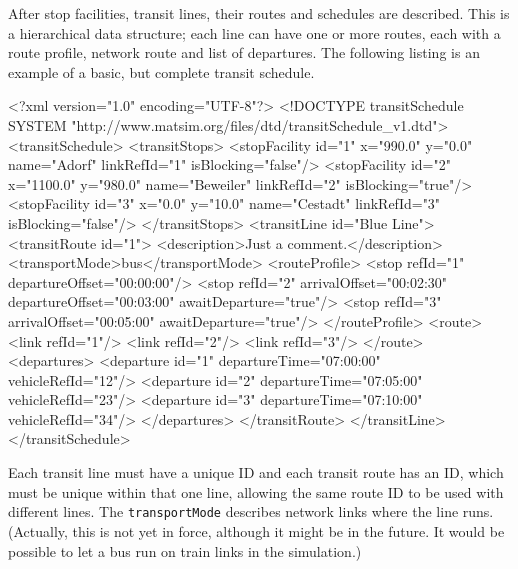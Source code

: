 After stop facilities, transit lines, their routes and schedules are described. This is a hierarchical data structure; each line can have one or more routes, each with a route profile, network route and list of departures. The following listing is an example of a basic, but complete transit schedule.
%
\begin{xml}
<?xml version="1.0" encoding="UTF-8"?> 
<!DOCTYPE transitSchedule SYSTEM "http://www.matsim.org/files/dtd/transitSchedule_v1.dtd"> 
<transitSchedule> 
   <transitStops> 
      <stopFacility id="1" x="990.0"  y="0.0"   name="Adorf" 
           linkRefId="1" isBlocking="false"/> 
      <stopFacility id="2" x="1100.0" y="980.0" name="Beweiler" 
           linkRefId="2" isBlocking="true"/> 
      <stopFacility id="3" x="0.0"    y="10.0"  name="Cestadt" 
           linkRefId="3" isBlocking="false"/> 
   </transitStops> 
   <transitLine id="Blue Line"> 
      <transitRoute id="1"> 
         <description>Just a comment.</description> 
         <transportMode>bus</transportMode> 
         <routeProfile> 
            <stop refId="1" departureOffset="00:00:00"/> 
            <stop refId="2" arrivalOffset="00:02:30" departureOffset="00:03:00" 
                                                     awaitDeparture="true"/> 
            <stop refId="3" arrivalOffset="00:05:00" awaitDeparture="true"/> 
         </routeProfile> 
         <route> 
            <link refId="1"/> 
            <link refId="2"/> 
            <link refId="3"/> 
         </route> 
         <departures> 
            <departure id="1" departureTime="07:00:00" vehicleRefId="12"/> 
            <departure id="2" departureTime="07:05:00" vehicleRefId="23"/> 
            <departure id="3" departureTime="07:10:00" vehicleRefId="34"/> 
         </departures> 
      </transitRoute> 
   </transitLine> 
</transitSchedule>
\end{xml}

Each transit line must have a unique ID and each transit route has an ID, which must be unique within that one line, allowing the same route ID to be used with different lines. The \lstinline|transportMode| describes network links where the line runs. (Actually, this is not yet in force, although it might be in the future. It would be possible to let a bus run on train links in the simulation.)

